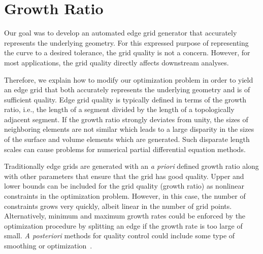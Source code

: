 \section{Growth Ratio}
Our goal was to develop an automated edge grid generator that accurately 
represents the underlying geometry.  For this expressed purpose of 
representing the curve to a desired tolerance, the grid quality 
is not a concern.  However, for most applications, the grid quality 
directly affects downstream analyses.

Therefore, we explain how to modify our optimization problem in order to 
yield an edge grid that both accurately represents the underlying geometry 
and is of sufficient quality.  Edge grid quality is typically defined in 
terms of the growth ratio, i.e., the length of a segment divided by the 
length of a topologically adjacent segment.  If the growth ratio strongly 
deviates from unity, the sizes of neighboring elements are not 
similar which leads to a large disparity in the sizes of the surface and 
volume elements which are generated.  Such disparate length scales can 
cause problems for numerical partial differential equation methods.

Traditionally edge grids are generated with an {\it{a priori}} defined 
growth ratio along with other parameters that ensure that the grid has 
good quality.  Upper and lower bounds can be included for the grid 
quality (growth ratio) as nonlinear constraints in the optimization problem.  However, in 
this case, the number of constraints grows very quickly, albeit 
linear in the number of grid points.  Alternatively, minimum and maximum 
growth rates could be enforced by the optimization procedure by splitting 
an edge if the growth rate is too large of small.  {\it{A posteriori}} 
methods for quality control could include some type of 
smoothing or optimization~\cite{lori_pat,feasnewt,multiobjective,logbarrier}.

